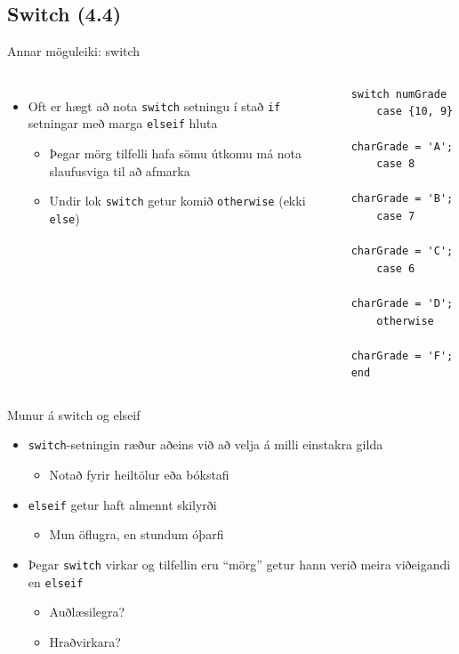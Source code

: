 \documentclass{beamer}
\begin{document}
\subsection{Switch (4.4)}
\begin{frame}[fragile]{Annar möguleiki: switch}
\begin{columns}
\begin{itemize}
 \item Oft er hægt að nota \texttt{switch} setningu í stað \texttt{if} setningar með marga \texttt{elseif} hluta
 \begin{itemize}
  \item Þegar mörg tilfelli hafa sömu útkomu má nota slaufusviga til að afmarka
  \item Undir lok \texttt{switch} getur komið \texttt{otherwise} (ekki \texttt{else})
 \end{itemize}

\end{itemize}

\vspace{\baselineskip}
\begin{verbatim}
switch numGrade
    case {10, 9}
        charGrade = 'A';
    case 8
        charGrade = 'B';
    case 7
        charGrade = 'C';
    case 6
        charGrade = 'D';
    otherwise
        charGrade = 'F';
end
\end{verbatim}
\end{columns}
\end{frame}

\begin{frame}{Munur á switch og elseif}
\begin{itemize}
 \item \texttt{switch}-setningin ræður aðeins við að velja á milli einstakra gilda
 \begin{itemize}
  \item Notað fyrir heiltölur eða bókstafi
 \end{itemize}
 \item \texttt{elseif} getur haft almennt skilyrði
 \begin{itemize}
  \item Mun öflugra, en stundum óþarfi
 \end{itemize}
 \item Þegar \texttt{switch} virkar og tilfellin eru ``mörg'' getur hann verið meira viðeigandi en \texttt{elseif}
 \begin{itemize}
  \item Auðlæsilegra?
  \item Hraðvirkara?
 \end{itemize}
\end{itemize}
\end{frame}
\end{document}
